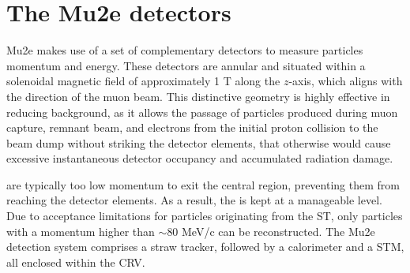 \section{The Mu2e detectors}
Mu2e makes use of a set of complementary detectors to 
measure particles momentum and energy. These detectors 
are annular and situated within a solenoidal magnetic field of 
approximately 1 T along the $z$-axis, which aligns with 
the direction of the muon beam. This distinctive geometry 
is highly effective in reducing background, as it allows 
the passage of particles produced during muon capture, 
remnant beam, and electrons from the initial proton collision to the beam dump without striking
the detector elements, that otherwise would cause excessive instantaneous detector 
occupancy and accumulated radiation damage. 

are typically too low momentum 
to exit the central region, preventing them from reaching the detector elements. 
As a result, the  is kept at a manageable level. 
Due to acceptance limitations for particles originating from the ST, 
only particles with a momentum higher than $\sim$80 MeV/c can be reconstructed.
The Mu2e detection system comprises a straw tracker, followed by a 
calorimeter and a STM, all enclosed within the CRV.


